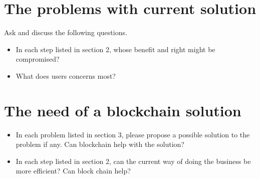 \documentclass[]{scrartcl}
\begin{document}
\section{The problems with current solution}
Ask and discuss the following questions.
\begin{itemize}
\item In each step listed in section 2, whose benefit and right might be compromised?
\item What does users concerns most?
\end{itemize}

\section{The need of a blockchain solution}
\begin{itemize}
\item In each problem listed in section 3, please propose a possible solution to the problem if any. Can blockchain help with the solution?
\item In each step listed in section 2, can the current way of doing the business be more efficient? Can block chain help?
\end{itemize}
\end{document}
